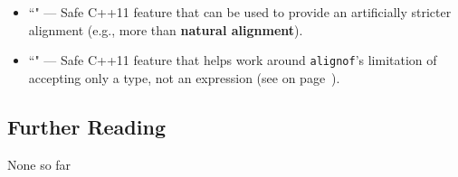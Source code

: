 \begin{itemize}
\item{``" — Safe C++11 feature that can be used to provide an artificially stricter alignment (e.g., more than \textbf{natural alignment}).}
\item{``" — Safe C++11 feature that helps work around \texttt{alignof}'s limitation of accepting only a type, not an expression (see \textit{} on page~\pageref{annoyances-alignof}).}
\end{itemize}

\subsection[Further Reading]{Further Reading}\label{further-reading}

None so far



